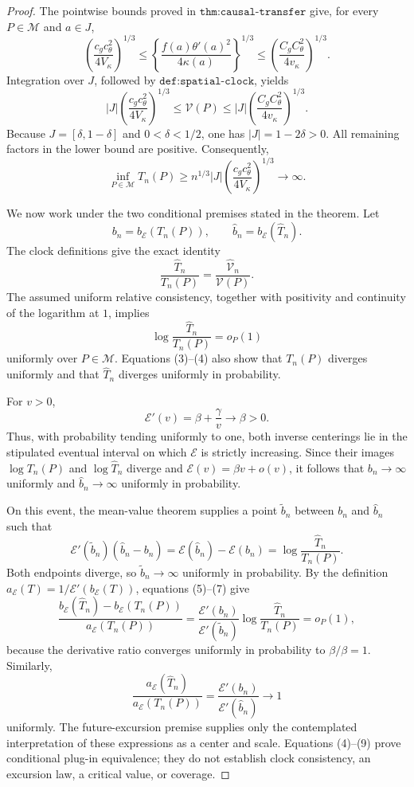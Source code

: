 \documentclass{article}
\begin{document}
\begin{proof}
The pointwise bounds proved in \(\texttt{thm:causal-transfer}\) give, for every \(P\in\mathcal M\) and \(a\in J\),
\[
 \left(\frac{c_gc_\theta^2}{4V_\kappa}\right)^{1/3}
 \le
 \left\{\frac{f(a)\theta'(a)^2}{4\kappa(a)}\right\}^{1/3}
 \le
 \left(\frac{C_gC_\theta^2}{4v_\kappa}\right)^{1/3}. \tag{1}
\]
Integration over \(J\), followed by \(\texttt{def:spatial-clock}\), yields
\[
 |J|\left(\frac{c_gc_\theta^2}{4V_\kappa}\right)^{1/3}
 \le\mathcal V(P)\le
 |J|\left(\frac{C_gC_\theta^2}{4v_\kappa}\right)^{1/3}. \tag{2}
\]
Because \(J=[\delta,1-\delta]\) and \(0<\delta<1/2\), one has \(|J|=1-2\delta>0\).  All remaining factors in the lower bound are positive.  Consequently,
\[
 \inf_{P\in\mathcal M}T_n(P)
 \ge n^{1/3}|J|\left(\frac{c_gc_\theta^2}{4V_\kappa}\right)^{1/3}
 \longrightarrow\infty. \tag{3}
\]

We now work under the two conditional premises stated in the theorem.  Let
\[
 b_n=b_{\mathcal E}(T_n(P)),
 \qquad
 \widehat b_n=b_{\mathcal E}(\widehat T_n).
\]
The clock definitions give the exact identity
\[
 \frac{\widehat T_n}{T_n(P)}
 =\frac{\widehat{\mathcal V}_n}{\mathcal V(P)}. \tag{4}
\]
The assumed uniform relative consistency, together with positivity and continuity of the logarithm at \(1\), implies
\[
 \log\frac{\widehat T_n}{T_n(P)}=o_P(1) \tag{5}
\]
uniformly over \(P\in\mathcal M\).  Equations (3)--(4) also show that \(T_n(P)\) diverges uniformly and that \(\widehat T_n\) diverges uniformly in probability.

For \(v>0\),
\[
 \mathcal E'(v)=\beta+\frac{\gamma}{v}\longrightarrow\beta>0. \tag{6}
\]
Thus, with probability tending uniformly to one, both inverse centerings lie in the stipulated eventual interval on which \(\mathcal E\) is strictly increasing.  Since their images \(\log T_n(P)\) and \(\log\widehat T_n\) diverge and \(\mathcal E(v)=\beta v+o(v)\), it follows that \(b_n\to\infty\) uniformly and \(\widehat b_n\to\infty\) uniformly in probability.

On this event, the mean-value theorem supplies a point \(\widetilde b_n\) between \(b_n\) and \(\widehat b_n\) such that
\[
 \mathcal E'(\widetilde b_n)(\widehat b_n-b_n)
 =\mathcal E(\widehat b_n)-\mathcal E(b_n)
 =\log\frac{\widehat T_n}{T_n(P)}. \tag{7}
\]
Both endpoints diverge, so \(\widetilde b_n\to\infty\) uniformly in probability.  By the definition
\(
 a_{\mathcal E}(T)=1/\mathcal E'(b_{\mathcal E}(T))
\), equations (5)--(7) give
\[
 \frac{b_{\mathcal E}(\widehat T_n)-b_{\mathcal E}(T_n(P))}
 {a_{\mathcal E}(T_n(P))}
 =\frac{\mathcal E'(b_n)}{\mathcal E'(\widetilde b_n)}
 \log\frac{\widehat T_n}{T_n(P)}
 =o_P(1), \tag{8}
\]
because the derivative ratio converges uniformly in probability to \(\beta/\beta=1\).  Similarly,
\[
 \frac{a_{\mathcal E}(\widehat T_n)}{a_{\mathcal E}(T_n(P))}
 =\frac{\mathcal E'(b_n)}{\mathcal E'(\widehat b_n)}
 \longrightarrow1 \tag{9}
\]
uniformly.  The future-excursion premise supplies only the contemplated interpretation of these expressions as a center and scale.  Equations (4)--(9) prove conditional plug-in equivalence; they do not establish clock consistency, an excursion law, a critical value, or coverage.
\end{proof}
\end{document}

